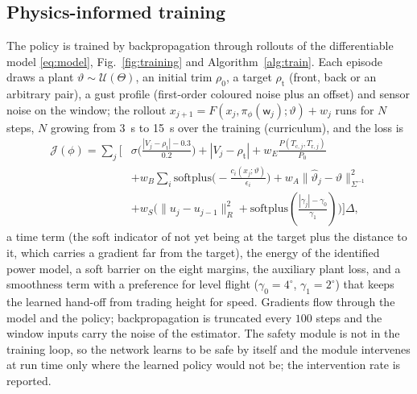 \subsection{Physics-informed training}
The policy is trained by backpropagation through rollouts of the differentiable model \eqref{eq:model}, Fig.~\ref{fig:training} and Algorithm~\ref{alg:train}. Each episode draws a plant $\vartheta\sim\mathcal U(\Theta)$, an initial trim $\rho_0$, a target $\rho_{\mathrm t}$ (front, back or an arbitrary pair), a gust profile (first-order coloured noise plus an offset) and sensor noise on the window; the rollout $x_{j+1}=F(x_j,\pi_\phi(\mathsf w_j);\vartheta)+w_j$ runs for $N$ steps, $N$ growing from \SI{3}{s} to \SI{15}{s} over the training (curriculum), and the loss is
\begin{equation}\label{eq:loss}
\begin{aligned}\mathcal J(\phi)=\sum_{j}\Big[&\sigma\big(\tfrac{|V_j-\rho_{\mathrm t}|-0.3}{0.2}\big)+|V_j-\rho_{\mathrm t}|+w_E\tfrac{P(T_{\mathrm c,j},T_{\mathrm r,j})}{P_0}\\ &+w_B\sum_{i}\mathrm{softplus}\big(-\tfrac{c_i(x_j;\vartheta)}{\epsilon_i}\big)+w_A\|\hat\vartheta_j-\vartheta\|_{\Sigma^{-1}}^2\\ &+w_S\big(\|u_j-u_{j-1}\|_R^2+\mathrm{softplus}(\tfrac{|\gamma_j|-\gamma_0}{\gamma_1})\big)\Big]\Delta,\end{aligned}
\end{equation}
a time term (the soft indicator of not yet being at the target plus the distance to it, which carries a gradient far from the target), the energy of the identified power model, a soft barrier on the eight margins, the auxiliary plant loss, and a smoothness term with a preference for level flight ($\gamma_0=4^\circ$, $\gamma_1=2^\circ$) that keeps the learned hand-off from trading height for speed. Gradients flow through the model and the policy; backpropagation is truncated every $100$ steps and the window inputs carry the noise of the estimator. The safety module is not in the training loop, so the network learns to be safe by itself and the module intervenes at run time only where the learned policy would not be; the intervention rate is reported.

